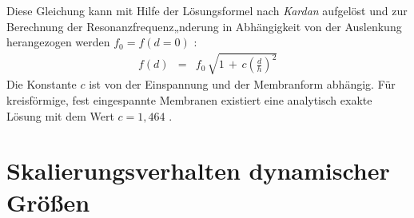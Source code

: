 %
Diese Gleichung kann mit Hilfe der Lösungsformel nach {\sl Kardan} aufgelöst
und zur Berechnung der Resonanzfrequenz„nderung in Abhängigkeit von der
Auslenkung herangezogen werden $f_0 = f(d=0)$ \cite{Utt87}:
%
\begin{eqnarray}
\label{fvond}
     f(d) & = & f_{0} \, \sqrt{ 1 \, + \, c \left( \frac{d}{h} \right)^{2}}
\end{eqnarray}
%
Die Konstante $c$ ist von der Einspannung und der Membranform
abhängig. Für kreisförmige, fest eingespannte Membranen existiert eine
analytisch exakte Lösung mit dem Wert $c = 1,464$ \cite{Utt87}.



\section{Skalierungsverhalten dynamischer Größen}
\label{skalierungsverhalten}

